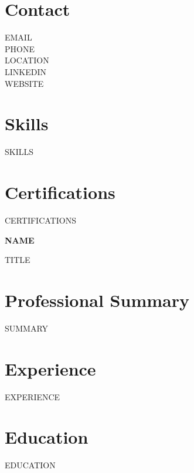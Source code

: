 \documentclass[10pt,a4paper]{article}
\begin{document}
\setlength{\columnsep}{1cm}
\begin{paracol}{2}

\hfuzz=100pt %

\begin{leftcolumn}

\section*{Contact}
\small
{{EMAIL}}\\[0.3em]
{{PHONE}}\\[0.3em]
{{LOCATION}}\\[0.3em]
{{LINKEDIN}}\\[0.3em]
{{WEBSITE}}

\vspace{1em}

\section*{Skills}
{{SKILLS}}

\vspace{1em}

\section*{Certifications}
{{CERTIFICATIONS}}

\end{leftcolumn}

\begin{rightcolumn}

{\Huge\bfseries\color{primary} {{NAME}}}

\vspace{0.3em}
{\large\color{secondary} {{TITLE}}}

\vspace{1em}

\section*{Professional Summary}
{{SUMMARY}}

\section*{Experience}
{{EXPERIENCE}}

\section*{Education}
{{EDUCATION}}

\end{rightcolumn}

\end{paracol}
\end{document}
